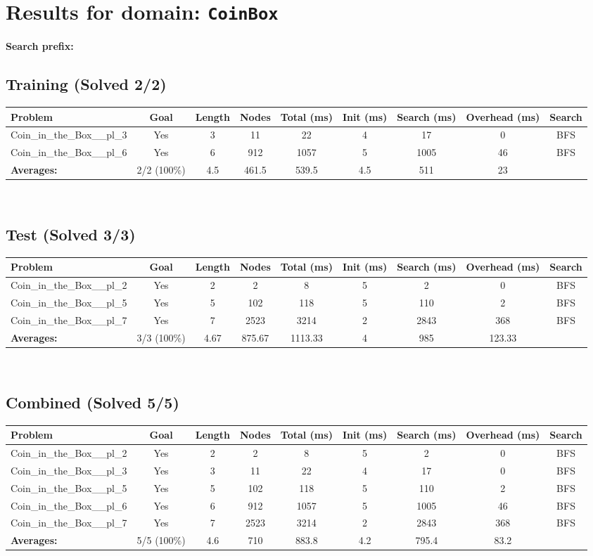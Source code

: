 \documentclass{article}
\begin{document}
\section*{Results for domain: \texttt{CoinBox}}
\textbf{Search prefix:} 
\\[0.5cm]
\subsection*{Training (Solved 2/2)}
\begin{tabular}{lcccccccc}
\toprule
Problem & Goal & Length & Nodes & Total (ms) & Init (ms) & Search (ms) & Overhead (ms) & Search \\
\midrule
Coin\_in\_the\_Box\_\_pl\_3 & Yes & 3 & 11 & 22 & 4 & 17 & 0 & BFS \\
Coin\_in\_the\_Box\_\_pl\_6 & Yes & 6 & 912 & 1057 & 5 & 1005 & 46 & BFS \\
\textbf{Averages:} & 2/2 (100\%) & 4.5 & 461.5 & 539.5 & 4.5 & 511 & 23 & \\
\bottomrule
\end{tabular}
\\[0.7cm]
\subsection*{Test (Solved 3/3)}
\begin{tabular}{lcccccccc}
\toprule
Problem & Goal & Length & Nodes & Total (ms) & Init (ms) & Search (ms) & Overhead (ms) & Search \\
\midrule
Coin\_in\_the\_Box\_\_pl\_2 & Yes & 2 & 2 & 8 & 5 & 2 & 0 & BFS \\
Coin\_in\_the\_Box\_\_pl\_5 & Yes & 5 & 102 & 118 & 5 & 110 & 2 & BFS \\
Coin\_in\_the\_Box\_\_pl\_7 & Yes & 7 & 2523 & 3214 & 2 & 2843 & 368 & BFS \\
\textbf{Averages:} & 3/3 (100\%) & 4.67 & 875.67 & 1113.33 & 4 & 985 & 123.33 & \\
\bottomrule
\end{tabular}
\\[0.7cm]
\subsection*{Combined (Solved 5/5)}
\begin{tabular}{lcccccccc}
\toprule
Problem & Goal & Length & Nodes & Total (ms) & Init (ms) & Search (ms) & Overhead (ms) & Search \\
\midrule
Coin\_in\_the\_Box\_\_pl\_2 & Yes & 2 & 2 & 8 & 5 & 2 & 0 & BFS \\
Coin\_in\_the\_Box\_\_pl\_3 & Yes & 3 & 11 & 22 & 4 & 17 & 0 & BFS \\
Coin\_in\_the\_Box\_\_pl\_5 & Yes & 5 & 102 & 118 & 5 & 110 & 2 & BFS \\
Coin\_in\_the\_Box\_\_pl\_6 & Yes & 6 & 912 & 1057 & 5 & 1005 & 46 & BFS \\
Coin\_in\_the\_Box\_\_pl\_7 & Yes & 7 & 2523 & 3214 & 2 & 2843 & 368 & BFS \\
\textbf{Averages:} & 5/5 (100\%) & 4.6 & 710 & 883.8 & 4.2 & 795.4 & 83.2 & \\
\bottomrule
\end{tabular}
\\[0.7cm]
\end{document}
